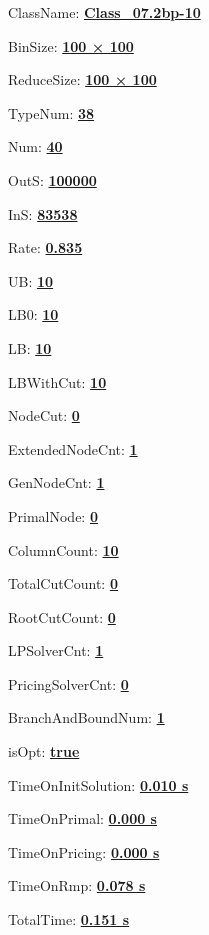 \documentclass[11pt]{article}
\begin{document}
\pagestyle{empty}


ClassName: \underline{\textbf{Class_07.2bp-10}}
\par
BinSize: \underline{\textbf{100 × 100}}
\par
ReduceSize: \underline{\textbf{100 × 100}}
\par
TypeNum: \underline{\textbf{38}}
\par
Num: \underline{\textbf{40}}
\par
OutS: \underline{\textbf{100000}}
\par
InS: \underline{\textbf{83538}}
\par
Rate: \underline{\textbf{0.835}}
\par
UB: \underline{\textbf{10}}
\par
LB0: \underline{\textbf{10}}
\par
LB: \underline{\textbf{10}}
\par
LBWithCut: \underline{\textbf{10}}
\par
NodeCut: \underline{\textbf{0}}
\par
ExtendedNodeCnt: \underline{\textbf{1}}
\par
GenNodeCnt: \underline{\textbf{1}}
\par
PrimalNode: \underline{\textbf{0}}
\par
ColumnCount: \underline{\textbf{10}}
\par
TotalCutCount: \underline{\textbf{0}}
\par
RootCutCount: \underline{\textbf{0}}
\par
LPSolverCnt: \underline{\textbf{1}}
\par
PricingSolverCnt: \underline{\textbf{0}}
\par
BranchAndBoundNum: \underline{\textbf{1}}
\par
isOpt: \underline{\textbf{true}}
\par
TimeOnInitSolution: \underline{\textbf{0.010 s}}
\par
TimeOnPrimal: \underline{\textbf{0.000 s}}
\par
TimeOnPricing: \underline{\textbf{0.000 s}}
\par
TimeOnRmp: \underline{\textbf{0.078 s}}
\par
TotalTime: \underline{\textbf{0.151 s}}
\par
\newpage


\end{document}
